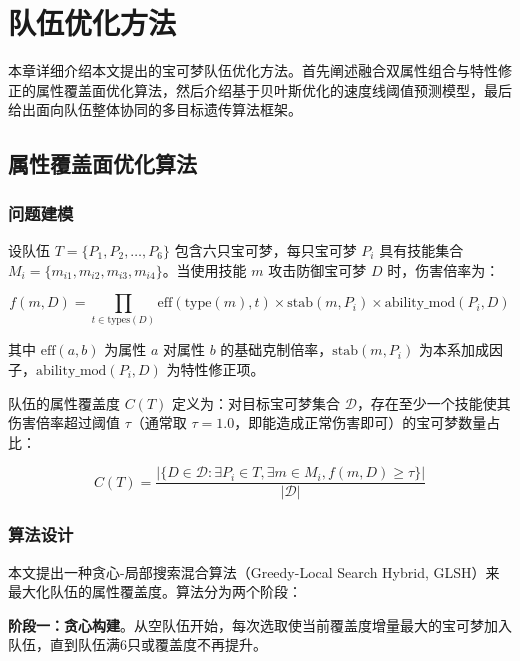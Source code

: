 \chapter{队伍优化方法}\label{chap:method}

本章详细介绍本文提出的宝可梦队伍优化方法。首先阐述融合双属性组合与特性修正的属性覆盖面优化算法，然后介绍基于贝叶斯优化的速度线阈值预测模型，最后给出面向队伍整体协同的多目标遗传算法框架。

\section{属性覆盖面优化算法}

\subsection{问题建模}

设队伍 $T = \{P_1, P_2, \ldots, P_6\}$ 包含六只宝可梦，每只宝可梦 $P_i$ 具有技能集合 $M_i = \{m_{i1}, m_{i2}, m_{i3}, m_{i4}\}$。当使用技能 $m$ 攻击防御宝可梦 $D$ 时，伤害倍率为：

\begin{equation}\label{eq:damage-mult}
    f(m, D) = \prod_{t \in \text{types}(D)} \text{eff}(\text{type}(m), t) \times \text{stab}(m, P_i) \times \text{ability\_mod}(P_i, D)
\end{equation}

其中 $\text{eff}(a, b)$ 为属性 $a$ 对属性 $b$ 的基础克制倍率，$\text{stab}(m, P_i)$ 为本系加成因子，$\text{ability\_mod}(P_i, D)$ 为特性修正项。

队伍的属性覆盖度 $C(T)$ 定义为：对目标宝可梦集合 $\mathcal{D}$，存在至少一个技能使其伤害倍率超过阈值 $\tau$（通常取 $\tau=1.0$，即能造成正常伤害即可）的宝可梦数量占比：

\begin{equation}\label{eq:coverage}
    C(T) = \frac{|\{D \in \mathcal{D} : \exists P_i \in T, \exists m \in M_i, f(m, D) \geq \tau\}|}{|\mathcal{D}|}
\end{equation}

\subsection{算法设计}

本文提出一种贪心-局部搜索混合算法（Greedy-Local Search Hybrid, GLSH）来最大化队伍的属性覆盖度。算法分为两个阶段：

\textbf{阶段一：贪心构建}。从空队伍开始，每次选取使当前覆盖度增量最大的宝可梦加入队伍，直到队伍满6只或覆盖度不再提升。

